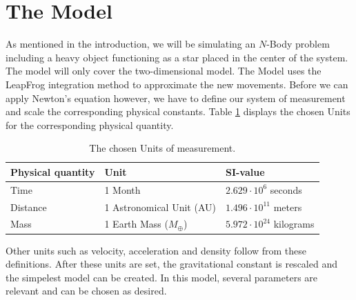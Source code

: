 \section{The Model}
As mentioned in the introduction, we will be simulating an \(N\)-Body problem including a heavy  object functioning as a star placed in the center of the system. The model will only cover the two-dimensional model.
The Model uses the LeapFrog integration method to approximate the new movements. 
Before we can apply Newton's equation however, we have to define our system of measurement and scale the corresponding physical constants.
Table \ref{tab:eenheden} displays the chosen Units for the corresponding physical quantity.

\begin{table}[h!]
\centering
\caption{The chosen Units of measurement.}
\label{tab:eenheden}
\begin{tabular}{l|l|l}
  Physical quantity & Unit & SI-value \\ \hline
Time & 1 Month & \(2.629\cdot 10^{6}\) seconds  \\ 
 Distance & 1 Astronomical Unit (AU) & \(1.496\cdot10^{11}\) meters   \\
 Mass & 1 Earth Mass (\(M_\oplus\))& \(5.972\cdot10^{24}\) kilograms \\
\end{tabular}
\end{table}
Other units such as velocity, acceleration and density follow from these definitions. After these units are set, the gravitational constant is rescaled and the simpelest model can be created.
In this model, several parameters are relevant and can be chosen as desired. 
